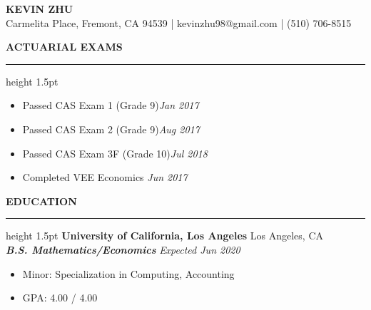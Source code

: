 \documentclass[11pt,letterpaper]{article}
\newcommand{\sectline}{\vspace{4pt}\hrule height 1.5pt\vspace{4pt}}
\newcommand{\sectspace}{\vspace{8pt}}
\begin{document}
\centering
{\fontsize{13pt}{13pt}\selectfont \textbf{KEVIN ZHU}} \vspace{2pt} \\
{\fontsize{12pt}{13pt} Carmelita Place, Fremont, CA 94539 | kevinzhu98@gmail.com | (510) 706-8515}
\sectspace

\fontsize{11pt}{13pt}\selectfont
\raggedright
\textbf{ACTUARIAL EXAMS}\sectline
\begin{itemize}
	\item Passed CAS Exam 1 (Grade 9)\hfill \textit{Jan 2017}
	\item Passed CAS Exam 2 (Grade 9)\hfill \textit{Aug 2017}
	\item Passed CAS Exam 3F (Grade 10)\hfill \textit{Jul 2018}
	\item Completed VEE Economics \hfill \textit{Jun 2017}
\end{itemize}
\sectspace


\textbf{EDUCATION}\sectline
\textbf{University of California, Los Angeles} \hfill Los Angeles, CA \\
\textbf{\textit{B.S. Mathematics/Economics}} \hfill \textit{Expected Jun 2020}
\begin{itemize}
	\item Minor: Specialization in Computing, Accounting
	\item GPA: 4.00 / 4.00
\end{itemize}
\sectspace
\end{document}
